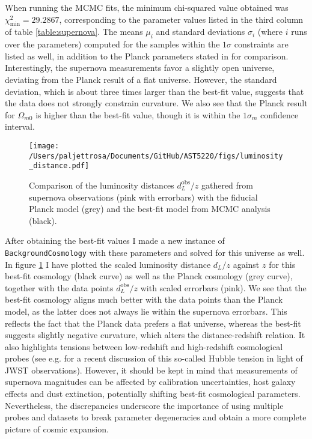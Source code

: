 \documentclass{aa}
\numberwithin{equation}{section}
\numberwithin{table}{section}
\numberwithin{figure}{section}
\begin{document}
When running the MCMC fits, the minimum chi-squared value obtained was $\chi^2_\text{min}=29.2867$, corresponding to the parameter values listed in the third column of table \ref{table:supernova}. The means $\mu_i$ and standard deviations $\sigma_i$ (where $i$ runs over the parameters) computed for the samples within the $1\sigma$ constraints are listed as well, in addition to the Planck parameters stated in \cite{Planck} for comparison. Interestingly, the supernova measurements favor a slightly open universe, deviating from the Planck result of a flat universe. However, the standard deviation, which is about three times larger than the best-fit value, suggests that the data does not strongly constrain curvature. We also see that the Planck result for $\Omega_{m0}$ is higher than the best-fit value, though it is within the $1\sigma_m$ confidence interval. 

\begin{figure}
    \centering
    \texttt{[image: /Users/paljettrosa/Documents/GitHub/AST5220/figs/luminosity\_distance.pdf]}
    \caption{Comparison of the luminosity distances $d_L^\text{obs}/z$ gathered from supernova observations (pink with errorbars) with the fiducial Planck model (grey) and the best-fit model from MCMC analysis (black).}\label{fig:luminosity distance}
\end{figure}

After obtaining the best-fit values I made a new instance of \verb|BackgroundCosmology| with these parameters and solved for this universe as well. In figure \ref{fig:luminosity distance} I have plotted the scaled luminosity distance $d_L/z$ against $z$ for this best-fit cosmology (black curve) as well as the Planck cosmology (grey curve), together with the data points $d_L^\text{obs}/z$ with scaled errorbars (pink). We see that the best-fit cosmology aligns much better with the data points than the Planck model, as the latter does not always lie within the supernova errorbars. This reflects the fact that the Planck data prefers a flat universe, whereas the best-fit suggests slightly negative curvature, which alters the distance-redshift relation. It also highlights tensions between low-redshift and high-redshift cosmological probes (see e.g. \cite{JWST} for a recent discussion of this so-called Hubble tension in light of JWST observations). However, it should be kept in mind that measurements of supernova magnitudes can be affected by calibration uncertainties, host galaxy effects and dust extinction, potentially shifting best-fit cosmological parameters. Nevertheless, the discrepancies underscore the importance of using multiple probes and datasets to break parameter degeneracies and obtain a more complete picture of cosmic expansion.
\end{document}
